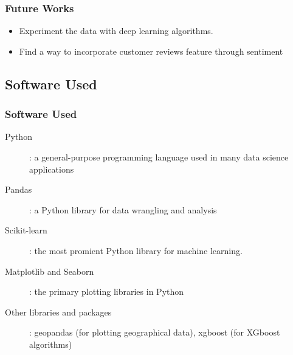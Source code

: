 \documentclass{beamer}
\begin{document}
\begin{frame}
  \frametitle{Future Works}
  \begin{itemize}
    \item Experiment the data with deep learning algorithms.
    \item Find a way to incorporate customer reviews feature through sentiment
  \end{itemize}

\end{frame}

\subsection{Software Used}

\begin{frame}
  \frametitle{Software Used}

\begin{description}
  \item[Python]: a general-purpose programming language used in many data
    science applications
  \item[Pandas] : a Python library for data wrangling and analysis
  \item[Scikit-learn]: the most promient Python library for machine learning.
  \item[Matplotlib and Seaborn]: the primary plotting libraries in Python
  \item[Other libraries and packages]: geopandas (for plotting geographical
    data), xgboost (for XGboost algorithms)
\end{description}
\end{frame}
\end{document}
